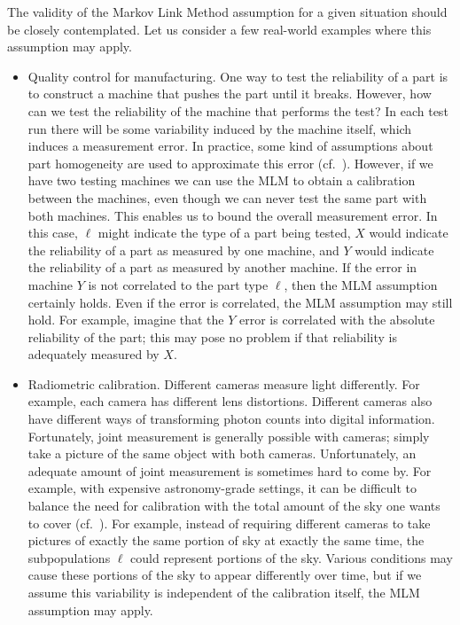 \label{sec:examples}

The validity of the Markov Link Method assumption for a given situation should be closely contemplated.  Let us consider a few real-world examples where this assumption may apply.

\begin{itemize}
    \item Quality control for manufacturing.   One way to test the reliability of a part is to construct a machine that pushes the part until it breaks.  However, how can we test the reliability of the machine that performs the test?  In each test run there will be some variability induced by the machine itself, which induces a measurement error.  In practice, some kind of assumptions about part homogeneity are used to approximate this error (cf.\ \cite{de2005gauge}).  However, if we have two testing machines we can use the MLM to obtain a calibration between the machines, even though we can never test the same part with both machines.  This enables us to bound the overall measurement error.  In this case, $\ell$ might indicate the type of a part being tested, $X$ would indicate the reliability of a part as measured by one machine, and $Y$ would indicate the reliability of a part as measured by another machine.  If the error in machine $Y$ is not correlated to the part type $\ell$, then the MLM assumption certainly holds.  Even if the error is correlated, the MLM assumption may still hold.  For example, imagine that the $Y$ error is correlated with the absolute reliability of the part; this may pose no problem if that reliability is adequately measured by $X$.  

    \item Radiometric calibration.  Different cameras measure light differently.  For example, each camera has different lens distortions.  Different cameras also have different ways of transforming photon counts into digital information.   Fortunately, joint measurement is generally possible with cameras; simply take a picture of the same object with both cameras.  Unfortunately, an adequate amount of joint measurement is sometimes hard to come by.  For example, with expensive astronomy-grade settings, it can be difficult to balance the need for calibration with the total amount of the sky one wants to cover (cf.\ \cite{padmanabhan2008improved}). For example, instead of requiring different cameras to take pictures of exactly the same portion of sky at exactly the same time, the subpopulations $\ell$ could represent portions of the sky.  Various conditions may cause these portions of the sky to appear differently over time, but if we assume this variability is independent of the calibration itself, the MLM assumption may apply.  
 

\end{itemize}
